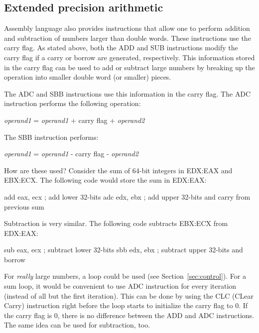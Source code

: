 \subsection{Extended precision arithmetic \label{sec:ExtPrecArith} }

Assembly language also provides instructions that allow one to perform
addition and subtraction of numbers larger than double words. These
instructions use the carry flag. As stated above, both the {\code ADD}
 and {\code SUB}  instructions modify the carry
flag if a carry or borrow are generated, respectively. This
information stored in the carry flag can be used to add or subtract
large numbers by breaking up the operation into smaller double word
(or smaller) pieces.

The {\code ADC}  and {\code SBB}  instructions
use this information in the carry flag. The {\code ADC} instruction
performs the following operation:
\begin{center}
{\code \emph{operand1} = \emph{operand1} + carry flag + \emph{operand2} }
\end{center}
The {\code SBB} instruction performs:
\begin{center}
{\code \emph{operand1} = \emph{operand1} - carry flag - \emph{operand2} }
\end{center}
How are these used? Consider the sum of 64-bit integers in
EDX:EAX and EBX:ECX. The following code would store the
sum in EDX:EAX:
\begin{AsmCodeListing}[frame=none]
      add    eax, ecx       ; add lower 32-bits
      adc    edx, ebx       ; add upper 32-bits and carry from previous sum
\end{AsmCodeListing}
Subtraction is very similar. The following code subtracts EBX:ECX from 
EDX:EAX:
\begin{AsmCodeListing}[frame=none]
      sub    eax, ecx       ; subtract lower 32-bits
      sbb    edx, ebx       ; subtract upper 32-bits and borrow
\end{AsmCodeListing}

For \emph{really} large numbers, a loop could be used (see 
Section~\ref{sec:control}). For a sum loop, it would be convenient to use
{\code ADC} instruction for every iteration (instead of all but the first
iteration). This can be done by using the {\code CLC}  (CLear Carry)
instruction right before the loop starts to initialize the carry flag to 0.
If the carry flag is 0, there is no difference between the {\code ADD} and
{\code ADC} instructions. The same idea can be used for subtraction, too.

